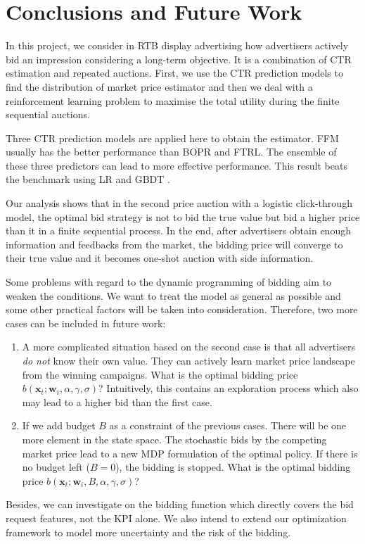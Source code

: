 \chapter{Conclusions and Future Work}
\label{chapterlabel6}

In this project, we consider in RTB display advertising how advertisers actively bid an impression considering a long-term objective. It is a combination of CTR estimation and repeated auctions. First, we use the CTR prediction models to find the distribution of market price estimator and then we deal with a reinforcement learning problem to maximise the total utility during the finite sequential auctions.

Three CTR prediction models are applied here to obtain the estimator. FFM usually has the better performance than BOPR and FTRL. The ensemble of these three predictors can lead to more effective performance. This result beats the benchmark using LR and GBDT \cite{zhang2014real}.

Our analysis shows that in the second price auction with a logistic click-through model, the optimal bid strategy is not to bid the true value but bid a higher price than it in a finite sequential process. In the end, after advertisers obtain enough information and feedbacks from the market, the bidding price will converge to their true value and it becomes one-shot auction with side information.

Some problems with regard to the dynamic programming of bidding aim to weaken the conditions. We want to treat the model as general as possible and some other practical factors will be taken into consideration. Therefore, two more cases can be included in future work: 

\begin{enumerate}
\item A more complicated situation based on the second case is that all advertisers \emph{do not} know their own value. They can actively learn market price landscape from the winning campaigns.  What is the optimal bidding price $b(\mathbf{x}_t; \mathbf{w}_i,\alpha,\gamma ,\sigma)$? Intuitively, this contains an exploration process which also may lead to a higher bid than the first case.

\item If we add budget $B$ as a constraint of the previous cases. There will be one more element in the state space. The stochastic bids by the competing market price lead to a new MDP formulation of the optimal policy. If there is no budget left ($B=0$), the bidding is stopped. What is the optimal bidding price $b(\mathbf{x}_t; \mathbf{w}_i, B, \alpha,\gamma ,\sigma)$? 
\end{enumerate}

Besides, we can investigate on the bidding function which directly covers the bid request features, not the KPI alone. We also intend to extend our optimization framework to model more uncertainty and the risk of the bidding.